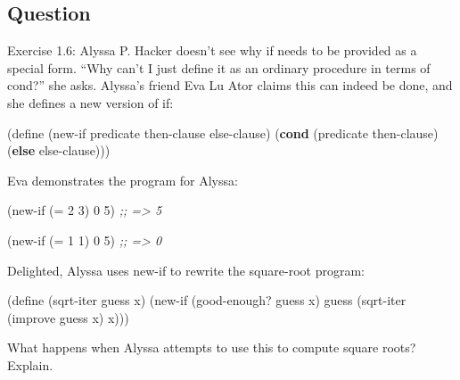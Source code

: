 \documentclass[
]{article}
\newenvironment{Shaded}{}{}
\newcommand{\CommentTok}[1]{\textcolor[rgb]{0.38,0.63,0.69}{\textit{#1}}}
\newcommand{\DecValTok}[1]{\textcolor[rgb]{0.25,0.63,0.44}{#1}}
\newcommand{\ExtensionTok}[1]{#1}
\newcommand{\FunctionTok}[1]{\textcolor[rgb]{0.02,0.16,0.49}{#1}}
\newcommand{\KeywordTok}[1]{\textcolor[rgb]{0.00,0.44,0.13}{\textbf{#1}}}
\newcommand{\NormalTok}[1]{#1}
\newcommand{\OperatorTok}[1]{\textcolor[rgb]{0.40,0.40,0.40}{#1}}
\begin{document}
\hypertarget{question-5}{%
\subsection{Question}\label{question-5}}

Exercise 1.6: Alyssa P. Hacker doesn't see why if needs to be provided
as a special form. ``Why can't I just define it as an ordinary procedure
in terms of cond?'' she asks. Alyssa's friend Eva Lu Ator claims this
can indeed be done, and she defines a new version of if:

\begin{Shaded}
\begin{Highlighting}[numbers=left,,]
\NormalTok{(}\ExtensionTok{define}\FunctionTok{ }\NormalTok{(new{-}if predicate}
\NormalTok{                then{-}clause}
\NormalTok{                else{-}clause)}
\NormalTok{  (}\KeywordTok{cond}\NormalTok{ (predicate then{-}clause)}
\NormalTok{        (}\KeywordTok{else}\NormalTok{ else{-}clause)))}
\end{Highlighting}
\end{Shaded}

Eva demonstrates the program for Alyssa:

\begin{Shaded}
\begin{Highlighting}[numbers=left,,]
\NormalTok{(new{-}if (}\OperatorTok{=} \DecValTok{2} \DecValTok{3}\NormalTok{) }\DecValTok{0} \DecValTok{5}\NormalTok{)}
\CommentTok{;; =\textgreater{} 5}

\NormalTok{(new{-}if (}\OperatorTok{=} \DecValTok{1} \DecValTok{1}\NormalTok{) }\DecValTok{0} \DecValTok{5}\NormalTok{)}
\CommentTok{;; =\textgreater{} 0}
\end{Highlighting}
\end{Shaded}

Delighted, Alyssa uses new-if to rewrite the square-root program:

\begin{Shaded}
\begin{Highlighting}[numbers=left,,]
\NormalTok{(}\ExtensionTok{define}\FunctionTok{ }\NormalTok{(sqrt{-}iter guess x)}
\NormalTok{  (new{-}if (good{-}enough? guess x)}
\NormalTok{          guess}
\NormalTok{          (sqrt{-}iter (improve guess x) x)))}
\end{Highlighting}
\end{Shaded}

What happens when Alyssa attempts to use this to compute square roots?
Explain.
\end{document}
